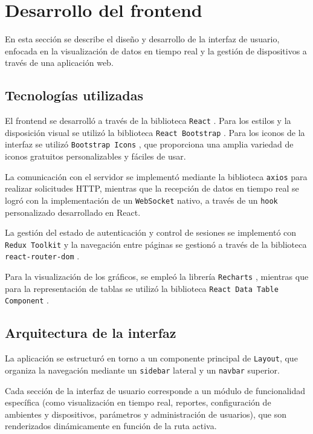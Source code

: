 \section{Desarrollo del frontend}

En esta sección se describe el diseño y desarrollo de la interfaz de usuario,
enfocada en la visualización de datos en tiempo real y la gestión de
dispositivos a través de una aplicación web.

\subsection{Tecnologías utilizadas}

El frontend se desarrolló a través de la biblioteca \texttt{React}
\cite{React}. Para los estilos y la disposición visual se utilizó la biblioteca
\texttt{React Bootstrap} \cite{ReactBootstrap}. Para los iconos de la interfaz
se utilizó \texttt{Bootstrap Icons} \cite{BootstrapIcons}, que proporciona una
amplia variedad de iconos gratuitos personalizables y fáciles de usar.

La comunicación con el servidor se implementó mediante la biblioteca
\texttt{axios} \cite{Axios} para realizar solicitudes HTTP, mientras que la
recepción de datos en tiempo real se logró con la implementación de un
\texttt{WebSocket} nativo, a través de un \texttt{hook} personalizado
desarrollado en React.

La gestión del estado de autenticación y control de sesiones se implementó con
\texttt{Redux Toolkit} \cite{ReduxToolkit} y la navegación entre páginas se
gestionó a través de la biblioteca \texttt{react-router-dom}
\cite{ReactRouter}.

Para la visualización de los gráficos, se empleó la librería \texttt{Recharts}
\cite{Recharts}, mientras que para la representación de tablas se utilizó la
biblioteca \texttt{React Data Table Component} \cite{ReactDataTable}.

\subsection{Arquitectura de la interfaz}

La aplicación se estructuró en torno a un componente principal de
\texttt{Layout}, que organiza la navegación mediante un \texttt{sidebar}
lateral y un \texttt{navbar} superior.

Cada sección de la interfaz de usuario corresponde a un módulo de funcionalidad
específica (como visualización en tiempo real, reportes, configuración de
ambientes y dispositivos, parámetros y administración de usuarios), que son
renderizados dinámicamente en función de la ruta activa.

